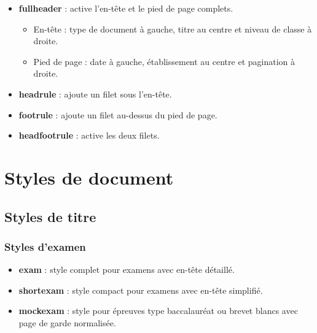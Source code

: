 \documentclass[
    french,
    margin=2cm
]{neoschool}
\begin{document}
\begin{itemize}

\item
  \textbf{fullheader} : active l'en-tête et le pied de page complets.
  \begin{itemize}
  \item En-tête : type de document à gauche, titre au centre et niveau de classe à
    droite.
  \item Pied de page : date à gauche, établissement au centre et pagination
    à droite.
  \end{itemize}
\item \textbf{headrule} : ajoute un filet sous l'en-tête.
\item \textbf{footrule} : ajoute un filet au-dessus du pied de page.
\item \textbf{headfootrule} : active les deux filets.
\end{itemize}

\section{Styles de document}

\subsection{Styles de titre}

\subsubsection{Styles d'examen}

\begin{itemize}

\item \textbf{exam} : style complet pour examens avec en-tête détaillé.
\end{itemize}


\begin{itemize}

\item \textbf{shortexam} : style compact pour examens avec en-tête simplifié.
\item \textbf{mockexam} : style pour épreuves type baccalauréat ou brevet blancs
  avec page de garde normalisée.
\end{itemize}
\end{document}
